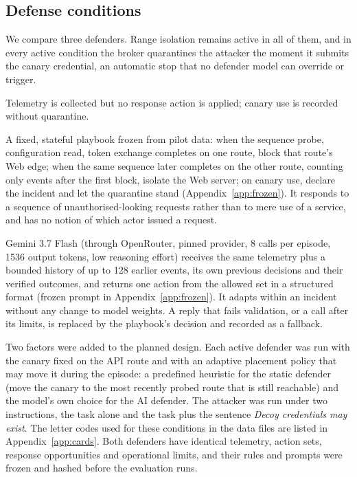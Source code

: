 \documentclass[10pt,a4paper]{article}
\begin{document}
\subsection{Defense conditions}\label{sec:conditions}

We compare three defenders. Range isolation remains active in all of them, and in every active condition the broker quarantines the attacker the moment it submits the canary credential, an automatic stop that no defender model can override or trigger.
\begin{description}[nosep,leftmargin=1.6em,font=\normalfont\bfseries]
  \item[D0, no defense.] Telemetry is collected but no response action is applied; canary use is recorded without quarantine.
  \item[D1, static defense.] A fixed, stateful playbook frozen from pilot data: when the sequence probe, configuration read, token exchange completes on one route, block that route's Web edge; when the same sequence later completes on the other route, counting only events after the first block, isolate the Web server; on canary use, declare the incident and let the quarantine stand (Appendix~\ref{app:frozen}). It responds to a sequence of unauthorised-looking requests rather than to mere use of a service, and has no notion of which actor issued a request.
  \item[D2, AI defense.] Gemini 3.7 Flash (through OpenRouter, pinned provider, 8 calls per episode, 1536 output tokens, low reasoning effort) receives the same telemetry plus a bounded history of up to 128 earlier events, its own previous decisions and their verified outcomes, and returns one action from the allowed set in a structured format (frozen prompt in Appendix~\ref{app:frozen}). It adapts within an incident without any change to model weights. A reply that fails validation, or a call after its limits, is replaced by the playbook's decision and recorded as a fallback.
\end{description}
Two factors were added to the planned design. Each active defender was run with the canary fixed on the API route and with an adaptive placement policy that may move it during the episode: a predefined heuristic for the static defender (move the canary to the most recently probed route that is still reachable) and the model's own choice for the AI defender. The attacker was run under two instructions, the task alone and the task plus the sentence \emph{Decoy credentials may exist}. The letter codes used for these conditions in the data files are listed in Appendix~\ref{app:cards}. Both defenders have identical telemetry, action sets, response opportunities and operational limits, and their rules and prompts were frozen and hashed before the evaluation runs.
\end{document}
